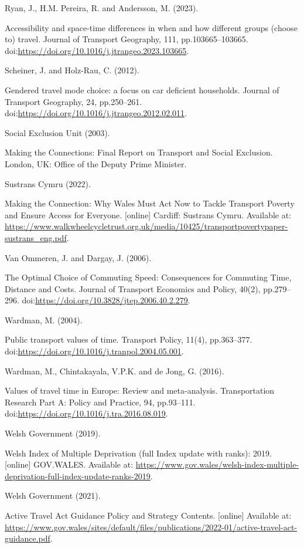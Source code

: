 \documentclass[11pt,a4paper]{article}
\begin{document}
\begin{sloppypar}
\hypertarget{ryan2023}{Ryan, J., H.M. Pereira, R. and Andersson, M. (2023).} Accessibility and space-time differences in when and how different groups (choose to) travel. Journal of Transport Geography, 111, pp.103665–103665. doi:\url{https://doi.org/10.1016/j.jtrangeo.2023.103665}.

\hypertarget{scheiner2012}{Scheiner, J. and Holz-Rau, C. (2012).} Gendered travel mode choice: a focus on car deficient households. Journal of Transport Geography, 24, pp.250–261. doi:\url{https://doi.org/10.1016/j.jtrangeo.2012.02.011}.

\hypertarget{socialexclusion2003}{Social Exclusion Unit (2003).} Making the Connections: Final Report on Transport and Social Exclusion. London, UK: Office of the Deputy Prime Minister.

\hypertarget{sustrans2022}{Sustrans Cymru (2022).} Making the Connection: Why Wales Must Act Now to Tackle Transport Poverty and Ensure Access for Everyone. [online] Cardiff: Sustrans Cymru. Available at: \url{https://www.walkwheelcycletrust.org.uk/media/10425/transportpovertypaper-sustrans_eng.pdf}.

\hypertarget{vanommeren2006}{Van Ommeren, J. and Dargay, J. (2006).} The Optimal Choice of Commuting Speed: Consequences for Commuting Time, Distance and Costs. Journal of Transport Economics and Policy, 40(2), pp.279–296. doi:\url{https://doi.org/10.3828/jtep.2006.40.2.279}.

\hypertarget{wardman2004}{Wardman, M. (2004).} Public transport values of time. Transport Policy, 11(4), pp.363–377. doi:\url{https://doi.org/10.1016/j.tranpol.2004.05.001}.

\hypertarget{wardman2016}{Wardman, M., Chintakayala, V.P.K. and de Jong, G. (2016).} Values of travel time in Europe: Review and meta-analysis. Transportation Research Part A: Policy and Practice, 94, pp.93–111. doi:\url{https://doi.org/10.1016/j.tra.2016.08.019}.

\hypertarget{welshgov2019}{Welsh Government (2019).} Welsh Index of Multiple Deprivation (full Index update with ranks): 2019. [online] GOV.WALES. Available at: \url{https://www.gov.wales/welsh-index-multiple-deprivation-full-index-update-ranks-2019}.

\hypertarget{welshgov2021active}{Welsh Government (2021).} Active Travel Act Guidance Policy and Strategy Contents. [online] Available at: \url{https://www.gov.wales/sites/default/files/publications/2022-01/active-travel-act-guidance.pdf}.


\end{sloppypar}
\end{document}
